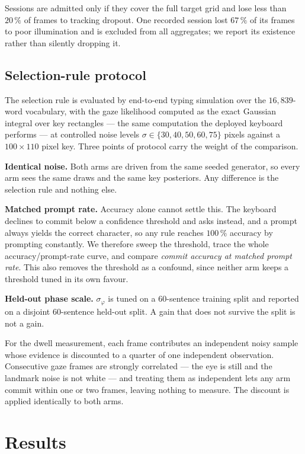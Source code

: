 \documentclass[conference]{IEEEtran}
\begin{document}
Sessions are admitted only if they cover the full target grid and lose less than
$20\,\%$ of frames to tracking dropout. One recorded session lost $67\,\%$ of its
frames to poor illumination and is excluded from all aggregates; we report its
existence rather than silently dropping it.

\subsection{Selection-rule protocol}
\label{sec:ruleproto}

The selection rule is evaluated by end-to-end typing simulation over the
$16{,}839$-word vocabulary, with the gaze likelihood computed as the exact
Gaussian integral over key rectangles --- the same computation the deployed
keyboard performs --- at controlled noise levels $\sigma \in \{30,40,50,60,75\}$
pixels against a $100 \times 110$ pixel key. Three points of protocol carry the
weight of the comparison.

\textbf{Identical noise.} Both arms are driven from the same seeded generator,
so every arm sees the same draws and the same key posteriors. Any difference is
the selection rule and nothing else.

\textbf{Matched prompt rate.} Accuracy alone cannot settle this. The keyboard
declines to commit below a confidence threshold and asks instead, and a prompt
always yields the correct character, so any rule reaches $100\,\%$ accuracy by
prompting constantly. We therefore sweep the threshold, trace the whole
accuracy/prompt-rate curve, and compare \emph{commit accuracy at matched prompt
rate}. This also removes the threshold as a confound, since neither arm keeps a
threshold tuned in its own favour.

\textbf{Held-out phase scale.} $\sigma_\varphi$ is tuned on a $60$-sentence
training split and reported on a disjoint $60$-sentence held-out split. A gain
that does not survive the split is not a gain.

For the dwell measurement, each frame contributes an independent noisy sample
whose evidence is discounted to a quarter of one independent observation.
Consecutive gaze frames are strongly correlated --- the eye is still and the
landmark noise is not white --- and treating them as independent lets any arm
commit within one or two frames, leaving nothing to measure. The discount is
applied identically to both arms.

\section{Results}
\label{sec:results}
\end{document}
